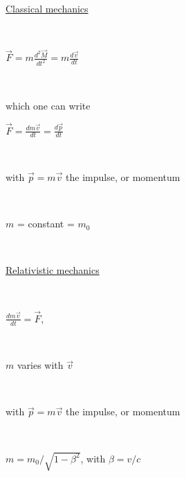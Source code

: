 \documentclass[12pt]{paper}
\newcommand{\F}{\ensuremath{\vec F}}
\newcommand{\vv}{\ensuremath{\vec v}}
\newcommand{\blue}{\color{blue}}
\begin{document}
\begin{minipage}[b]{.49\linewidth}
\centering
\Large

\blue 

\underline{Classical mechanics }

~

$\F = m \frac{ \textstyle{d^2 \vec M}}{\textstyle{dt^2}} = m \frac{ \textstyle{d\vv}}{\textstyle{dt}} $ 

~

which one can  write

$\F =   \frac{ \textstyle{d m \vv}}{\textstyle{dt}} =  \frac{ \textstyle{d\vec p}}{\textstyle{dt}}  $ 

~

with $\vec p = m \vv$ the impulse, or momentum

~

 $m$  = constant = $m_0$

~
\end{minipage}
\begin{minipage}[b]{.49\linewidth}
\centering
\Large

\blue 

\underline{Relativistic mechanics}


~

$\frac{ \textstyle{dm\vv}}{\textstyle{dt}} = \F $, 

~

 $m$ varies with $\vv$

~

with $\vec p = m \vv$ the impulse, or momentum

~

 $m = m_0 / \sqrt{1- \beta^2}$, with $\beta = v/c$

~

~

\end{minipage}



\clearpage

\end{document}
